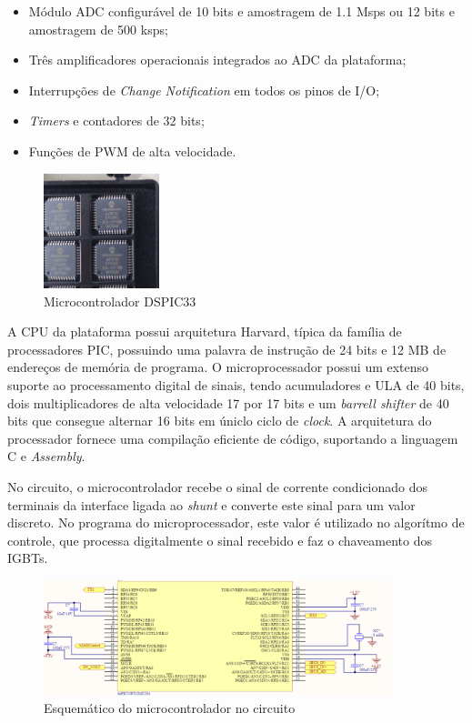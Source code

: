 \begin{itemize}
    \item Módulo ADC configurável de 10 bits e amostragem de 1.1 Msps ou 12 bits e amostragem de 500 ksps;
    \item Três amplificadores operacionais integrados ao ADC da plataforma;
    \item Interrupções de \textit{Change Notification} em todos os pinos de I/O;
    \item \textit{Timers} e contadores de 32 bits;
    \item Funções de PWM de alta velocidade.
\end{itemize} 

\begin{figure}[!htb]
    \centering
    \includegraphics[width=0.3\textwidth]{./dados/figuras/dspic}
    \caption{Microcontrolador DSPIC33}
    \label{fig:figura-dspic}
\end{figure}

A CPU da plataforma possui arquitetura Harvard, típica da família de processadores PIC, possuindo uma palavra de instrução de 24 bits e 12 MB de endereços de memória de programa. O microprocessador possui um extenso suporte ao processamento digital de sinais, tendo acumuladores e ULA de 40 bits, dois multiplicadores de alta velocidade 17 por 17 bits e um \textit{barrell shifter} de 40 bits que consegue alternar 16 bits em úniclo ciclo de \textit{clock}. A arquitetura do processador fornece uma compilação eficiente de código, suportando a linguagem C e \textit{Assembly}.

No circuito, o microcontrolador recebe o sinal de corrente  condicionado dos terminais da interface ligada ao \textit{shunt} e converte este sinal para um valor discreto. No programa do microprocessador, este valor é utilizado no algorítmo de controle, que processa digitalmente o sinal recebido e faz o chaveamento dos IGBTs.

\begin{figure}[!htb]
    \centering
    \includegraphics[width=0.9\textwidth]{./dados/figuras/proj-uc}
    \caption{Esquemático do microcontrolador no circuito}
    \label{fig:figura-dspic}
\end{figure}


